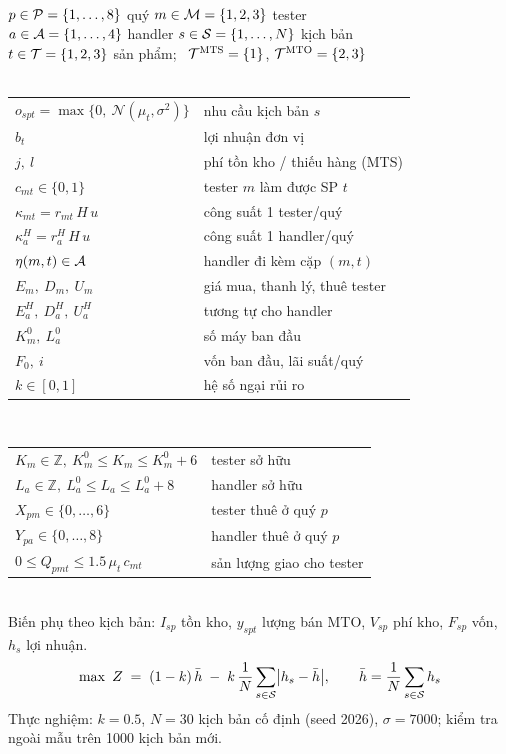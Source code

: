 \documentclass[11pt]{article}
\begin{document}
\begin{minipage}[t]{0.47\linewidth}
\\[2pt]
\small
$p\in\mathcal{P}=\{1,\dots,8\}$ quý \quad $m\in\mathcal{M}=\{1,2,3\}$ tester\\
$a\in\mathcal{A}=\{1,\dots,4\}$ handler \quad $s\in\mathcal{S}=\{1,\dots,N\}$ kịch bản\\
$t\in\mathcal{T}=\{1,2,3\}$ sản phẩm; \ $\mathcal{T}^{\text{MTS}}=\{1\}$, $\mathcal{T}^{\text{MTO}}=\{2,3\}$\\[5pt]
\\[2pt]
\begin{tabular}{@{}l@{\ \ }l@{}}
$o_{spt}=\max\{0,\ \mathcal N(\mu_t,\sigma^2)\}$ & nhu cầu kịch bản $s$\\
$b_t$ & lợi nhuận đơn vị\\
$j,\ l$ & phí tồn kho / thiếu hàng (MTS)\\
$c_{mt}\in\{0,1\}$ & tester $m$ làm được SP $t$\\
$\kappa_{mt}=r_{mt}\,H\,u$ & công suất 1 tester/quý\\
$\kappa^{H}_{a}=r^{H}_{a}\,H\,u$ & công suất 1 handler/quý\\
$\eta(m,t)\in\mathcal{A}$ & handler đi kèm cặp $(m,t)$\\
$E_m,\ D_m,\ U_m$ & giá mua, thanh lý, thuê tester\\
$E^H_a,\ D^H_a,\ U^H_a$ & tương tự cho handler\\
$K^0_m,\ L^0_a$ & số máy ban đầu\\
$F_0,\ i$ & vốn ban đầu, lãi suất/quý\\
$k\in[0,1]$ & hệ số ngại rủi ro
\end{tabular}
\end{minipage}\hfill
\begin{minipage}[t]{0.5\linewidth}
\\[2pt]
\small
\begin{tabular}{@{}l@{\ \ }l@{}}
$K_m\in\mathbb Z,\ K^0_m\le K_m\le K^0_m+6$ & tester sở hữu\\
$L_a\in\mathbb Z,\ L^0_a\le L_a\le L^0_a+8$ & handler sở hữu\\
$X_{pm}\in\{0,\dots,6\}$ & tester thuê ở quý $p$\\
$Y_{pa}\in\{0,\dots,8\}$ & handler thuê ở quý $p$\\
$0\le Q_{pmt}\le 1.5\,\mu_t\,c_{mt}$ & sản lượng giao cho tester
\end{tabular}\\[4pt]
{\color{gr}Biến phụ theo kịch bản: $I_{sp}$ tồn kho, $y_{spt}$ lượng bán MTO, $V_{sp}$ phí kho, $F_{sp}$ vốn, $h_s$ lợi nhuận.}\\[8pt]
\normalsize
\[
\max\ Z \;=\; (1-k)\,\bar h \;-\; k\,\frac1N\sum_{s\in\mathcal{S}}\bigl|h_s-\bar h\bigr|,
\qquad \bar h=\frac1N\sum_{s\in\mathcal{S}}h_s
\]
\small
{\color{gr}Thực nghiệm: $k=0.5$, $N=30$ kịch bản cố định (seed 2026), $\sigma=7000$;
kiểm tra ngoài mẫu trên 1000 kịch bản mới.}
\end{minipage}
\end{document}
